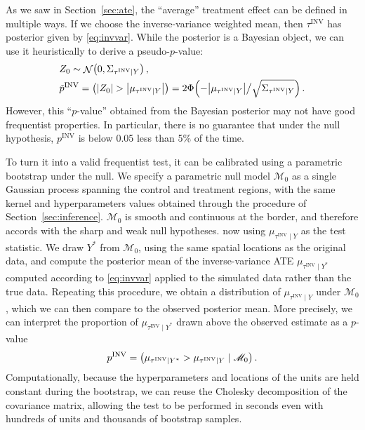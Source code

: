 \documentclass[letter,12pt]{article}
\DeclarePairedDelimiter{\parenthesis}{\lparen}{\rparen}
\DeclarePairedDelimiter{\absolutevalue}{\lvert}{\rvert}
\newcommand{\del}[1]{\parenthesis*{#1}}
\newcommand{\abs}[1]{\absolutevalue*{#1}}
\let\Pr\relax
\DeclareMathOperator{\Pr}{\mathbb{P}}
\DeclareMathOperator{\normal}{\mathcal{N}}
\newcommand{\invvar}{\tau^{\mathrm{INV}}}
\newcommand{\modnull}{\mathscr{M}_0}
\begin{document}
As we saw in Section~\ref{sec:ate}, the ``average'' treatment effect can be defined in multiple ways.
If we choose the inverse-variance weighted mean, then \(\invvar\) has posterior given by \eqref{eq:invvar}.
While the posterior is a Bayesian object, we can use it heuristically to derive a pseudo-\(p\)-value:
\begin{equation}
    \begin{split}
        & Z_0 \sim \normal\del{0, \Sigma_{\invvar \mid Y}} \,, \\
        & \tilde{p}^{\mathrm{INV}} = \Pr\del{ 
            \abs{Z_0} > 
            \abs{
                \mu_{
                    \invvar \mid Y
                }
            } 
        }
        = 2\Phi\del{-
            \abs{
                \mu_{
                    \invvar \mid Y
                }
            }
            \big/
            \sqrt{
                \Sigma_{\invvar \mid Y}
            }
    } \,.
\end{split}
\end{equation}
However, this ``\(p\)-value'' obtained from the Bayesian posterior may not have good frequentist properties.
In particular, there is no guarantee that under the null hypothesis, \(p^{\mathrm{INV}}\) is below 0.05 less than 5\% of the time.

To turn it into a valid frequentist test, it can be calibrated using a parametric bootstrap under the null.
We specify a parametric null model \(\modnull\)
as a single Gaussian process spanning the control and treatment regions,
with the same kernel and hyperparameters values obtained through the procedure of Section~\ref{sec:inference}.
\(\modnull\) is smooth and continuous at the border,
and therefore accords with the sharp and weak null hypotheses.
now using \(\mu_{\invvar \mid Y}\) as the test statistic.
We draw \(Y^*\) from \(\modnull\),
using the same spatial locations as the original data,
and compute the posterior mean of the inverse-variance ATE \(\mu_{\invvar \mid Y^*}\) computed according to \eqref{eq:invvar} applied to the simulated data rather than the true data.
Repeating this procedure, we obtain a distribution of \(\mu_{\invvar \mid Y}\) under \(\modnull\),
which we can then compare to the observed posterior mean.
More precisely, we can interpret the proportion of \(\mu_{\invvar \mid Y^*}\) drawn above the observed estimate as a \(p\)-value
\begin{equation}
    p^{\mathrm{INV}} = \Pr\del{\mu_{\invvar \mid Y^*} > \mu_{\invvar \mid Y} \mid \modnull}\,.
\end{equation}
Computationally, because the hyperparameters and locations of the units are held constant during the bootstrap, we can reuse the Cholesky decomposition of the covariance matrix, allowing the test to be performed in seconds even with hundreds of units and thousands of bootstrap samples.
\end{document}
